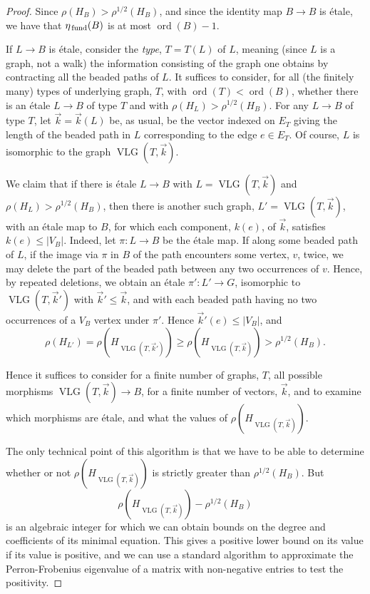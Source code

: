 \documentclass{memo-l}
\newcommand{\etafund}{{\eta_{\rm \,fund}}}
\theoremstyle{plain}
\theoremstyle{definition}
\numberwithin{section}{chapter}
\numberwithin{equation}{chapter}
\newcommand{\rhoroot}[1]{\rho^{1/2}(H_{#1})}
\DeclareMathOperator{\ord}{ord}
\DeclareMathOperator{\VLG}{VLG}
\newcommand{\from}{\colon}
\theoremstyle{plain}
\theoremstyle{definition}
\begin{document}
\begin{proof}
Since $\rho(H_B)>\rhoroot B $, and since
the identity
map $B\to B$ is \'etale, we have that 
$\etafund(B)$ is at most $\ord(B)-1$.

If $L\to B$ is \'etale, consider the {\em type}, $T=T(L)$ of $L$, meaning
(since $L$ is a graph, not a walk) the information consisting of the
graph one obtains by contracting all the beaded paths of
$L$.  It suffices to
consider, for all (the finitely many)
types of underlying graph, $T$, with $\ord(T)<\ord(B)$,
whether there is an \'etale $L\to B$ of type $T$ and with
$\rho(H_L)>\rhoroot B $.
For any $L\to B$ of type $T$, let $\vec k=\vec k(L)$ be, as usual,
be the vector indexed on $E_T$ giving the length of the beaded path
in $L$ corresponding to the edge $e\in E_T$.
Of course, $L$ is isomorphic to the graph $\VLG(T,\vec k)$.

We claim that if there is \'etale $L\to B$ with $L=\VLG(T,\vec k)$
and $\rho(H_L)>\rhoroot B $, then there is another such
graph, $L'=\VLG(T,\vec k)$, with an \'etale map to $B$, for which
each component, $k(e)$, of $\vec k$, satisfies $k(e)\le |V_B|$.
Indeed, let $\pi\from L\to B$ be the \'etale map.
If along some beaded path of $L$, if the image via $\pi$ in $B$ of the
path encounters some vertex, $v$,
twice, we may delete the part of the beaded path between any two
occurrences of $v$.  Hence, by repeated deletions, we obtain an \'etale
$\pi'\from L'\to G$, 
isomorphic to $\VLG(T,\vec k')$ with $\vec k'\le\vec k$, and
with each beaded path having no two occurrences of a $V_B$ vertex under
$\pi'$.  Hence $\vec k'(e)\le |V_B|$, and
$$
\rho(H_{L'}) =
\rho(H_{\VLG(T,\vec k')}) \ge
\rho(H_{\VLG(T,\vec k)}) > \rhoroot B .
$$

Hence it suffices to consider for a finite number of graphs, $T$,
all possible morphisms $\VLG(T,\vec k)\to B$, for a finite number
of vectors, $\vec k$, and to examine which morphisms are \'etale,
and what the values of $\rho(H_{\VLG(T,\vec k)})$.

The only technical point of this algorithm is that we have to be
able to determine whether or not $\rho(H_{\VLG(T,\vec k)})$ is strictly
greater
than $\rhoroot B$.
But 
$$
\rho(H_{\VLG(T,\vec k)}) - \rhoroot B 
$$
is an algebraic integer for which we can obtain bounds on the degree
and coefficients of its minimal equation.  This gives a positive lower
bound on its value if its value is positive, and we can use a
standard algorithm to approximate the Perron-Frobenius eigenvalue
of a matrix with non-negative entries to test the positivity.
\end{proof}
\end{document}

